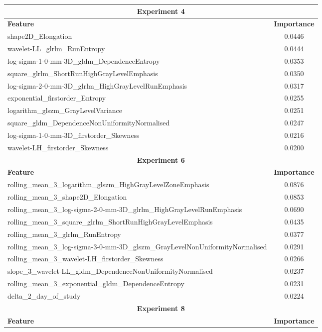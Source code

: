 \documentclass[12pt, a4paper]{report}
\begin{document}
\begin{table}[H]
{\begin{tabular}{|l|c|}
\hline
\multicolumn{2}{|c|}{\textbf{Experiment 4}} \\
\hline
\textbf{Feature} & \textbf{Importance} \\
\hline
shape2D\_Elongation & 0.0446 \\
wavelet-LL\_glrlm\_RunEntropy & 0.0444 \\
log-sigma-1-0-mm-3D\_gldm\_DependenceEntropy & 0.0353 \\
square\_glrlm\_ShortRunHighGrayLevelEmphasis & 0.0350 \\
log-sigma-2-0-mm-3D\_glrlm\_HighGrayLevelRunEmphasis & 0.0317 \\
exponential\_firstorder\_Entropy & 0.0255 \\
logarithm\_glszm\_GrayLevelVariance & 0.0251 \\
square\_gldm\_DependenceNonUniformityNormalised & 0.0247 \\
log-sigma-1-0-mm-3D\_firstorder\_Skewness & 0.0216 \\
wavelet-LH\_firstorder\_Skewness & 0.0200 \\
\hline
\multicolumn{2}{|c|}{\textbf{Experiment 6}} \\
\hline
\textbf{Feature} & \textbf{Importance} \\
\hline
rolling\_mean\_3\_logarithm\_glszm\_HighGrayLevelZoneEmphasis & 0.0876 \\
rolling\_mean\_3\_shape2D\_Elongation & 0.0853 \\
rolling\_mean\_3\_log-sigma-2-0-mm-3D\_glrlm\_HighGrayLevelRunEmphasis & 0.0690 \\
rolling\_mean\_3\_square\_glrlm\_ShortRunHighGrayLevelEmphasis & 0.0435 \\
rolling\_mean\_3\_glrlm\_RunEntropy & 0.0377 \\
rolling\_mean\_3\_log-sigma-3-0-mm-3D\_glszm\_GrayLevelNonUniformityNormalised & 0.0291 \\
rolling\_mean\_3\_wavelet-LH\_firstorder\_Skewness & 0.0266 \\
slope\_3\_wavelet-LL\_gldm\_DependenceNonUniformityNormalised & 0.0237 \\
rolling\_mean\_3\_exponential\_gldm\_DependenceEntropy & 0.0231 \\
delta\_2\_day\_of\_study & 0.0224 \\
\hline
\multicolumn{2}{|c|}{\textbf{Experiment 8}} \\
\hline
\textbf{Feature} & \textbf{Importance} \\
\hline

\end{tabular}}
\end{table}
\end{document}
